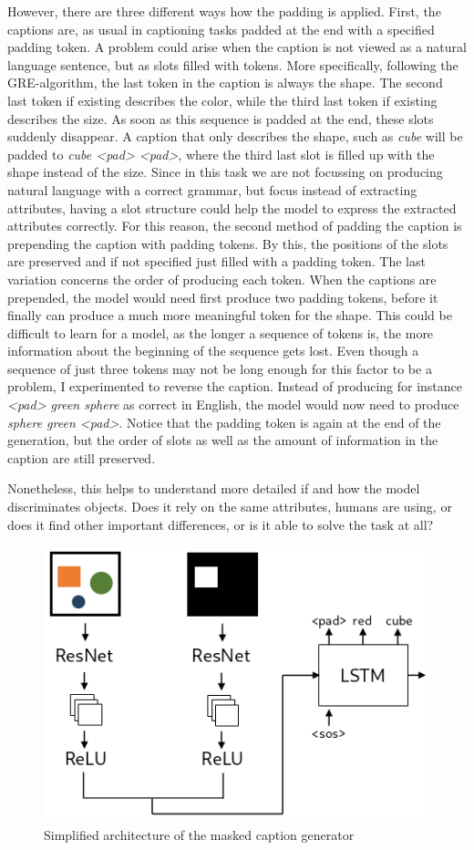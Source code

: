However, there are three different ways how the padding is applied.
First, the captions are, as usual in captioning tasks padded at the end with a specified padding token.
A problem could arise when the caption is not viewed as a natural language sentence, but as slots filled with tokens.
More specifically, following the GRE-algorithm, the last token in the caption is always the shape.
The second last token if existing describes the color, while the third last token if existing describes the size.
As soon as this sequence is padded at the end, these slots suddenly disappear.
A caption that only describes the shape, such as \emph{cube} will be padded to \emph{cube <pad> <pad>}, where the third last slot is filled up with the shape instead of the size.
Since in this task we are not focussing on producing natural language with a correct grammar, but focus instead of extracting attributes, having a slot structure could help the model to express the extracted attributes correctly.
For this reason, the second method of padding the caption is prepending the caption with padding tokens.
By this, the positions of the slots are preserved and if not specified just filled with a padding token.
The last variation concerns the order of producing each token.
When the captions are prepended, the model would need first produce two padding tokens, before it finally can produce a much more meaningful token for the shape.
This could be difficult to learn for a model, as the longer a sequence of tokens is, the more information about the beginning of the sequence gets lost.
Even though a sequence of just three tokens may not be long enough for this factor to be a problem, I experimented to reverse the caption.
Instead of producing for instance \emph{<pad> green sphere} as correct in English, the model would now need to produce \emph{sphere green <pad>}.
Notice that the padding token is again at the end of the generation, but the order of slots as well as the amount of information in the caption are still preserved.

Nonetheless, this helps to understand more detailed if and how the model discriminates objects.
Does it rely on the same attributes, humans are using, or does it find other important differences, or is it able to solve the task at all?

\begin{figure}[h]
    \centering
    \includegraphics[width=.5\linewidth]{figures/arch_caption_generator.png}
    \caption{Simplified architecture of the masked caption generator}
    \label{fig:caption_generator_architecture}
\end{figure}

